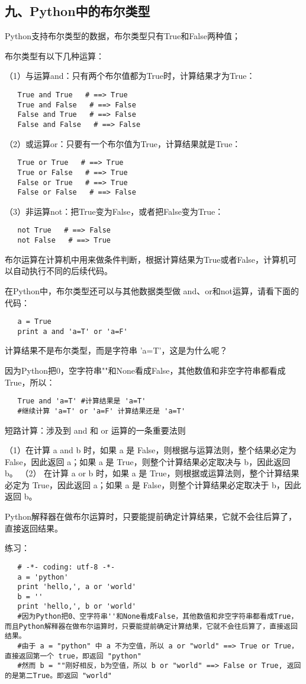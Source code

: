 \documentclass{article}
\begin{document}
\begin{CJK}{UTF8}{gbsn}
\part*{九、Python中的布尔类型}
\subparagraph*{}
Python支持布尔类型的数据，布尔类型只有True和False两种值；
\subparagraph*{}
布尔类型有以下几种运算：
\subparagraph*{}
（1）与运算and：只有两个布尔值都为True时，计算结果才为True：
\begin{verbatim}
   True and True   # ==> True
   True and False   # ==> False
   False and True   # ==> False
   False and False   # ==> False
\end{verbatim}
\subparagraph*{}
（2）或运算or：只要有一个布尔值为True，计算结果就是True：
\begin{verbatim}
   True or True   # ==> True
   True or False   # ==> True
   False or True   # ==> True
   False or False   # ==> False
\end{verbatim}
\subparagraph*{}
（3）非运算not：把True变为False，或者把False变为True：
\begin{verbatim}
   not True   # ==> False
   not False   # ==> True
\end{verbatim}
\subparagraph*{}
布尔运算在计算机中用来做条件判断，根据计算结果为True或者False，计算机可以自动执行不同的后续代码。
\subparagraph*{}
在Python中，布尔类型还可以与其他数据类型做 and、or和not运算，请看下面的代码：
\begin{verbatim}
   a = True
   print a and 'a=T' or 'a=F'
\end{verbatim}
\subparagraph*{}
计算结果不是布尔类型，而是字符串 'a=T'，这是为什么呢？
\subparagraph*{}
因为Python把0，空字符串""和None看成False，其他数值和非空字符串都看成True，所以：
\begin{verbatim}
   True and 'a=T' #计算结果是 'a=T'
   #继续计算 'a=T' or 'a=F' 计算结果还是 'a=T'
\end{verbatim}
\subparagraph*{}
短路计算：涉及到 and 和 or 运算的一条重要法则
\subparagraph*{}
（1）在计算 a and b 时，如果 a 是 False，则根据与运算法则，整个结果必定为 False，因此返回 a；如果 a 是 True，则整个计算结果必定取决与 b，因此返回 b。
（2） 在计算 a or b 时，如果 a 是 True，则根据或运算法则，整个计算结果必定为 True，因此返回 a；如果 a 是 False，则整个计算结果必定取决于 b，因此返回 b。
\subparagraph*{}
Python解释器在做布尔运算时，只要能提前确定计算结果，它就不会往后算了，直接返回结果。
\subparagraph*{}
练习：
\begin{verbatim}
   # -*- coding: utf-8 -*-
   a = 'python'
   print 'hello,', a or 'world'
   b = ''
   print 'hello,', b or 'world'
   #因为Python把0、空字符串''和None看成False，其他数值和非空字符串都看成True，而且Python解释器在做布尔运算时，只要能提前确定计算结果，它就不会往后算了，直接返回结果。
   #由于 a = "python" 中 a 不为空值，所以 a or "world" ==> True or True，直接返回第一个 true，即返回 "python"
   #然而 b = ""刚好相反，b为空值，所以 b or "world" ==> False or True, 返回的是第二True。即返回 "world"
\end{verbatim}
\end{CJK}
\end{document}
